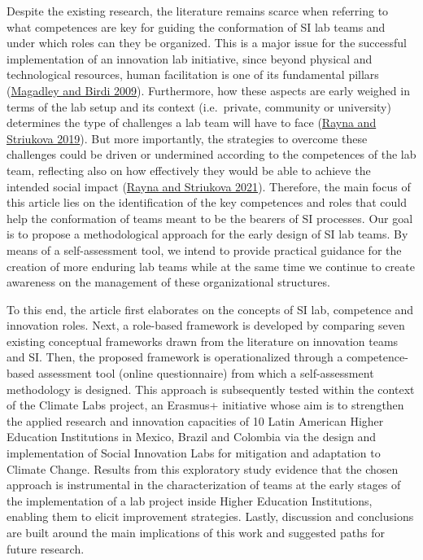 \documentclass[AMA,STIX1COL,APA,STIX2COL]{WileyNJD-v2}
\begin{document}
Despite the existing research, the literature remains scarce when
referring to what competences are key for guiding the conformation of SI
lab teams and under which roles can they be organized. This is a major
issue for the successful implementation of an innovation lab initiative,
since beyond physical and technological resources, human facilitation is
one of its fundamental pillars
(\protect\hyperlink{ref-Magadley2009}{Magadley and Birdi 2009}).
Furthermore, how these aspects are early weighed in terms of the lab
setup and its context (i.e.~private, community or university) determines
the type of challenges a lab team will have to face
(\protect\hyperlink{ref-Rayna2019}{Rayna and Striukova 2019}). But more
importantly, the strategies to overcome these challenges could be driven
or undermined according to the competences of the lab team, reflecting
also on how effectively they would be able to achieve the intended
social impact (\protect\hyperlink{ref-Rayna2021}{Rayna and Striukova
2021}). Therefore, the main focus of this article lies on the
identification of the key competences and roles that could help the
conformation of teams meant to be the bearers of SI processes. Our goal
is to propose a methodological approach for the early design of SI lab
teams. By means of a self-assessment tool, we intend to provide
practical guidance for the creation of more enduring lab teams while at
the same time we continue to create awareness on the management of these
organizational structures.

To this end, the article first elaborates on the concepts of SI lab,
competence and innovation roles. Next, a role-based framework is
developed by comparing seven existing conceptual frameworks drawn from
the literature on innovation teams and SI. Then, the proposed framework
is operationalized through a competence-based assessment tool (online
questionnaire) from which a self-assessment methodology is designed.
This approach is subsequently tested within the context of the Climate
Labs project, an Erasmus+ initiative whose aim is to strengthen the
applied research and innovation capacities of 10 Latin American Higher
Education Institutions in Mexico, Brazil and Colombia via the design and
implementation of Social Innovation Labs for mitigation and adaptation
to Climate Change. Results from this exploratory study evidence that the
chosen approach is instrumental in the characterization of teams at the
early stages of the implementation of a lab project inside Higher
Education Institutions, enabling them to elicit improvement strategies.
Lastly, discussion and conclusions are built around the main
implications of this work and suggested paths for future research.
\end{document}
